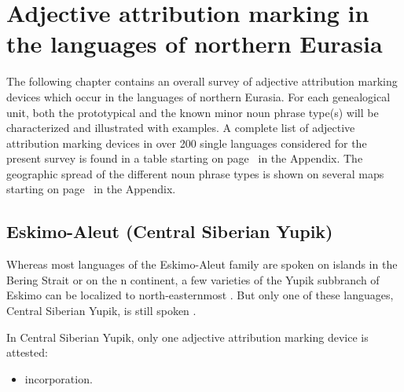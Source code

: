
\chapter[The languages of northern Eurasia]{Adjective attribution marking in the languages of northern Eurasia}

The following chapter contains an overall survey of adjective attribution marking devices which occur in the languages of northern Eurasia. For each genealogical unit, both the prototypical and the known minor noun phrase type(s) will be characterized and illustrated with examples. A complete list of adjective attribution marking devices in over 200 single languages considered for the present survey is found in a table starting on page~\pageref{sample1} in the Appendix. The geographic spread of the different noun phrase types is shown on several maps starting on page~\pageref{WorldMap} in the Appendix.

\section{Eskimo-Aleut (Central Siberian Yupik)}
Whereas most languages of the Eskimo-Aleut family are spoken on islands in the Bering Strait or on the n continent, a few varieties of the Yupik subbranch of Eskimo can be localized to north-easternmost . But only one of these languages, Central Siberian Yupik, is still spoken \citep[224]{salminen2007}.

In Central Siberian Yupik, only one adjective attribution marking device is attested:
\begin{itemize}
\item incorporation.
\end{itemize}

